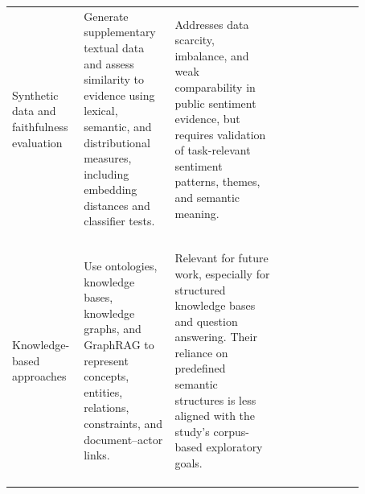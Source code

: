 \begin{table}[p]
\begin{tabular}{
>{\raggedright\arraybackslash}p{0.12\linewidth}
>{\raggedright\arraybackslash}p{0.24\linewidth}
>{\raggedright\arraybackslash}p{0.29\linewidth}
>{\raggedright\arraybackslash}p{0.22\linewidth} }
Synthetic data and faithfulness evaluation & Generate supplementary textual data and
assess similarity to evidence using lexical, semantic, and distributional measures,
including embedding distances and classifier tests. & Addresses data scarcity,
imbalance, and weak comparability in public sentiment evidence, but requires
validation of task-relevant sentiment patterns, themes, and semantic meaning. &
\vspace*{-.2cm}
\shortstack[l]{
\cite{argyle2023out}\\
\cite{snoke2018general}\\
\cite{stanley2024synthetic}\\
\cite{reimers2019sentence}\\
\cite{lopez2016revisiting}
} \\

Knowledge-based approaches & Use ontologies, knowledge bases, knowledge graphs, and
GraphRAG to represent concepts, entities, relations, constraints, and document--actor
links. & Relevant for future work, especially for structured knowledge bases and
question answering. Their reliance on predefined semantic
structures is less aligned with the study's corpus-based exploratory goals. & 
\vspace*{-.2cm}
\shortstack[l]{
\cite{musen2015protege}\\
\cite{horridge2011practical}\\
\cite{merono2025knowledge}\\
\cite{peng2024graphrag}
}\\

\bottomrule
\end{tabular}
\end{table}


